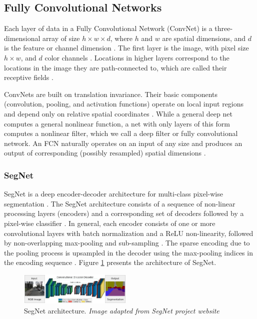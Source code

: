 \documentclass[10pt,twocolumn,letterpaper]{article}
\begin{document}
\subsection{Fully Convolutional Networks} \label{ssec:fully_conv}

Each layer of data in a Fully Convolutional Network (ConvNet) is a three-dimensional array of size $h \times w \times d$, where $h$ and $w$ are spatial dimensions, and $d$ is the feature or channel dimension \cite{FULLY_CONVOLU}. The first layer is the image, with pixel size $h \times w$, and $d$ color channels \cite{FULLY_CONVOLU}. Locations in higher layers correspond to the locations in the image they are path-connected to, which are called their receptive fields \cite{FULLY_CONVOLU}.

ConvNets are built on translation invariance. Their basic components (convolution, pooling, and activation functions) operate on local input regions and depend only on relative spatial coordinates \cite{FULLY_CONVOLU}. While a general deep net computes a general nonlinear function, a net with only layers of this form computes a
nonlinear filter, which we call a deep filter or fully convolutional network. An FCN naturally operates on an input of any size and produces an output of corresponding (possibly resampled) spatial dimensions \cite{FULLY_CONVOLU}.

\subsubsection{SegNet} \label{sssec:segnet}

SegNet is a deep encoder-decoder architecture for multi-class pixel-wise segmentation \cite{SEGNET}. The SegNet architecture consists of a sequence of non-linear processing layers (encoders) and a corresponding set of decoders followed by a pixel-wise classifier \cite{SEGNET} \cite{SEGNET_WEBSITE}. In general, each encoder consists of one or more convolutional layers with batch normalization and a ReLU non-linearity, followed by non-overlapping max-pooling and sub-sampling \cite{SEGNET} \cite{SEGNET_WEBSITE}. The sparse encoding due to the pooling process is upsampled in the decoder using the max-pooling indices in the encoding sequence \cite{SEGNET} \cite{SEGNET_WEBSITE}. Figure \ref{fig:segnet} presents the architecture of SegNet.

\begin{figure}[ht]
  \centering
  \includegraphics[width=0.48\textwidth]{segnet.png}
  \caption{SegNet architecture. \textit{Image adapted from SegNet project website} \cite{SEGNET_WEBSITE} \cite{SEGNET}}
  \label{fig:segnet}
\end{figure}
\end{document}
